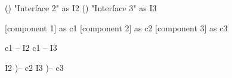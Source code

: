 \documentclass{scrartcl}
\begin{document}
\begin{plantuml}
() "Interface 2" as I2
() "Interface 3" as I3

[component 1] as c1
[component 2] as c2
[component 3] as c3

c1 -- I2
c1 -- I3

I2 )-- c2
I3 )-- c3
\end{plantuml}
\end{document}
